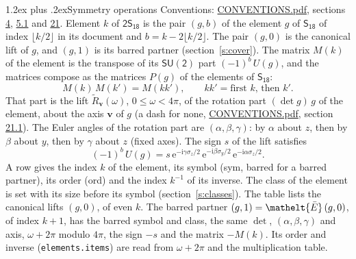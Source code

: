 \documentclass[10pt,a4paper]{article}
\makeatletter
\renewcommand\section{\@startsection{section}{1}{\z@}{-3ex plus -1ex minus -.2ex}%
  {1.2ex plus .2ex}{\normalfont\large\sffamily\bfseries\color{parttitle}}}
\numberwithin{equation}{section}
\newcommand{\eltfont}[1]{{\let\sigma\eltsigma\mathelt{#1}}}
\newcommand{\grp}[1]{\mathsf{#1}}
\newcommand{\elt}[1]{\eltfont{#1}}
\newcommand{\vv}{\mathbf{v}}
\newcommand{\iunit}{\mathrm{i}}
\newcommand{\expe}{\mathrm{e}}
\newcommand{\barred}[1]{\bar{#1}}
\newcommand{\lift}[1]{\tilde{#1}}
\newcommand{\pauli}[1]{\sigma_{#1}}
\makeatother
\begin{document}
\section{Symmetry operations}\label{s:elements}
Conventions: \href{../../CONVENTIONS.pdf}{CONVENTIONS.pdf}, sections \href{../../../rotation/CONVENTIONS.pdf\#conv.4}{4}, \href{../../../rotation/CONVENTIONS.pdf\#conv.5.1}{5.1} and \href{../../CONVENTIONS.pdf\#conv.21}{21}.
\leavevmode\label{n:index.element}\label{n:element.g}Element $k$ of $\grp{2S_{18}}$ is the pair $(g, b)$ of the element $g$ of \href{../../../rotation/data/pdf/S18.pdf}{$\grp{S_{18}}$} of index $\lfloor k/2\rfloor$ in its document and $b = k - 2\lfloor k/2\rfloor$. The pair $(g, 0)$ is the canonical lift of $g$, and $(g, 1)$ is its barred partner (section~\ref{s:cover}). \label{n:matrix.element.pin}\label{n:matrix.element}The matrix $M(k)$ of the element is the transpose of its $\grp{SU(2)}$ part $(-1)^{b}\,U(g)$, and the matrices compose as the matrices $P(g)$ of the elements of $\grp{S_{18}}$:
\begin{equation}\label{e:mprod}M(k)\,M(k') = M(kk'),\qquad kk' = \text{first } k\text{, then } k'.\end{equation}
\leavevmode\label{n:angle.omega}\label{n:vector.axis}\label{n:vector.pole}That part is the lift $\lift{R}_{\vv}(\omega)$, $0 \le \omega < 4\pi$, of the rotation part $(\det g)\,g$ of the element, about the axis $\vv$ of $g$ (a dash for none, \href{../../CONVENTIONS.pdf}{CONVENTIONS.pdf}, section \href{../../CONVENTIONS.pdf\#conv.21.1}{21.1}). \label{n:angle.euler.alpha}\label{n:angle.euler.beta}\label{n:angle.euler.gamma}\label{n:vector.coordinates}The Euler angles of the rotation part are $(\alpha,\beta,\gamma)$: by $\alpha$ about $z$, then by $\beta$ about $y$, then by $\gamma$ about $z$ (fixed axes). \label{n:local.euler.sign}The sign $s$ of the lift satisfies
\begin{equation}\label{e:euler}(-1)^{b}\,U(g) = s\,\expe^{-\iunit\gamma\pauli{z}/2}\,\expe^{-\iunit\beta\pauli{y}/2}\,\expe^{-\iunit\alpha\pauli{z}/2}.\end{equation}
\leavevmode\label{n:index.element.inverse}\label{n:head.sym}\label{n:head.ord}A row gives the index $k$ of the element, its symbol (sym, barred for a barred partner), its order (ord) and the index $k^{-1}$ of its inverse. \label{n:head.class}The class of the element is set with its size before its symbol (section~\ref{s:classes}).
The table lists the canonical lifts $(g, 0)$, of even $k$. The barred partner $(g, 1) = \elt{\barred{E}}\,(g, 0)$, of index $k + 1$, has the barred symbol and class, the same $\det$, $(\alpha,\beta,\gamma)$ and axis, $\omega + 2\pi$ modulo $4\pi$, the sign $-s$ and the matrix $-M(k)$. Its order and inverse (\texttt{elements.items}) are read from $\omega + 2\pi$ and the multiplication table.
\end{document}
